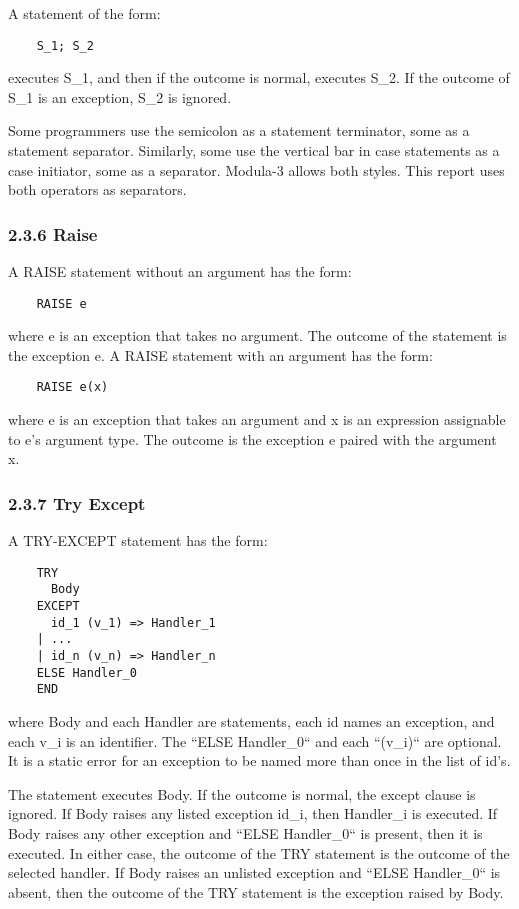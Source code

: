 \documentclass[10pt]{article}
\begin{document}
  A statement of the form: 
\begin{verbatim}
    S_1; S_2
\end{verbatim}
 executes S\_1, and then if the outcome is normal, executes S\_2. If the outcome of S\_1 is an exception, S\_2 is ignored. 


  Some programmers use the semicolon as a statement terminator, some as a statement separator. Similarly, some use the vertical bar in case statements as a case initiator, some as a separator. Modula-3 allows both styles. This report uses both operators as separators. 


 
\subsubsection*{2.3.6 Raise}


  A RAISE statement without an argument has the form: 
\begin{verbatim}
    RAISE e
\end{verbatim}
 where e is an exception that takes no argument. The outcome of the statement is the exception e. A RAISE statement with an argument has the form: 
\begin{verbatim}
    RAISE e(x)
\end{verbatim}
 where e is an exception that takes an argument and x is an expression assignable to e's argument type. The outcome is the exception e paired with the argument x. 


 
\subsubsection*{2.3.7 Try Except}


  A TRY-EXCEPT statement has the form: 
\begin{verbatim}
    TRY
      Body
    EXCEPT 
      id_1 (v_1) => Handler_1
    | ... 
    | id_n (v_n) => Handler_n
    ELSE Handler_0 
    END
\end{verbatim}
 where Body and each Handler are statements, each id names an exception, and each v\_i is an identifier. The ``ELSE Handler\_0`` and each ``(v\_i)`` are optional. It is a static error for an exception to be named more than once in the list of id's. 


 The statement executes Body. If the outcome is normal, the except clause is ignored. If Body raises any listed exception id\_i, then Handler\_i is executed. If Body raises any other exception and ``ELSE Handler\_0`` is present, then it is executed. In either case, the outcome of the TRY statement is the outcome of the selected handler. If Body raises an unlisted exception and ``ELSE Handler\_0`` is absent, then the outcome of the TRY statement is the exception raised by Body. 
\end{document}
